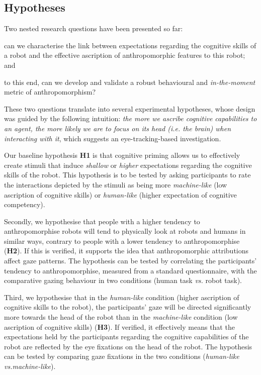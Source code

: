 \documentclass[lettersize, noapacite, twoside, HRI]{apa_HRI}
\newcommand{\ie}{\textit{i.e.}\xspace}
\newcommand{\vs}{\textit{vs.}\xspace}
\newcommand{\h}[1]{\textbf{H#1}\xspace}
\begin{document}
\subsection{Hypotheses}

\begin{inparaenum}
Two nested research questions have been presented so far: \item can we
characterise the link between expectations regarding the cognitive
skills of a robot and the effective ascription of anthropomorphic features to
this robot; and \item to this end, can we develop and validate a robust behavioural and
\emph{in-the-moment} metric of anthropomorphism?  \end{inparaenum}

These two questions translate into several experimental hypotheses, whose design
was guided by the following intuition: \emph{the more we ascribe cognitive
capabilities to an agent, the more likely we are to focus on its head (\ie the
brain) when
interacting with it}, which suggests an eye-tracking-based investigation.



Our baseline hypothesis \h{1} is that cognitive priming allows us to effectively create
stimuli that induce \emph{shallow} or \emph{higher} expectations regarding the
cognitive skills of the robot. This hypothesis is to be tested by asking
participants to rate the interactions depicted by the stimuli as being more
\emph{machine-like} (low ascription of cognitive skills) or \emph{human-like}
(higher expectation of cognitive competency).

Secondly, we hypothesise that people with a higher tendency to anthropomorphise
robots will tend to physically look at robots and humans in similar ways, contrary to
people with a lower tendency to anthropomorphise (\h{2}). If this is verified,
it supports the idea that anthropomorphic attributions affect gaze patterns. The
hypothesis can be tested by correlating the participants' tendency to
anthropomorphise, measured from a standard questionnaire, with the comparative
gazing behaviour in two conditions (human task \vs robot task).

Third, we hypothesise that in the \emph{human-like} condition (higher ascription
of cognitive skills to the robot), the participants' gaze will be directed
significantly more towards the head of the robot than in the \emph{machine-like}
condition (low ascription of cognitive skills) (\h{3}). If verified, it
effectively means that the expectations held by the participants regarding the
cognitive capabilities of the robot are reflected by the eye fixations on the
head of the robot.  The hypothesis can be tested by comparing gaze fixations in
the two conditions (\emph{human-like} \vs \emph{machine-like}).
\end{document}
